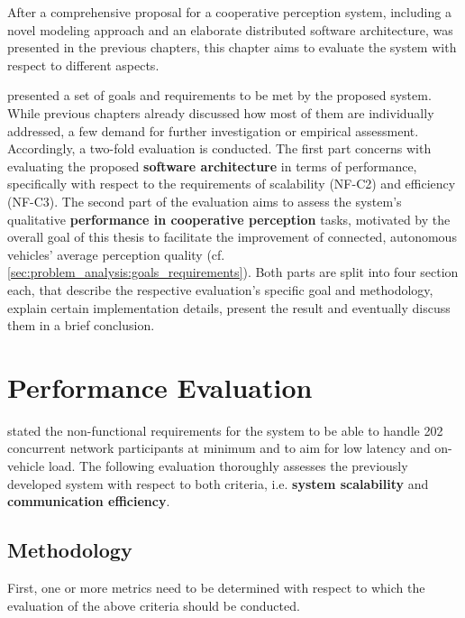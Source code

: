 After a comprehensive proposal for a cooperative perception system, including a novel modeling approach and an elaborate distributed software architecture, was presented in the previous chapters, this chapter aims to evaluate the system with respect to different aspects.

 presented a set of goals and requirements to be met by the proposed system. While previous chapters already discussed how most of them are individually addressed, a few demand for further investigation or empirical assessment. Accordingly, a two-fold evaluation is conducted. The first part concerns with evaluating the proposed \textbf{software architecture} in terms of performance, specifically with respect to the requirements of scalability (NF-C2) and efficiency (NF-C3). The second part of the evaluation aims to assess the system's qualitative \textbf{performance in cooperative perception} tasks, motivated by the overall goal of this thesis to facilitate the improvement of connected, autonomous vehicles' average perception quality (cf. \cref{sec:problem_analysis:goals_requirements}). Both parts are split into four section each, that describe the respective evaluation's specific goal and methodology, explain certain implementation details, present the result and eventually discuss them in a brief conclusion.

\section{Performance Evaluation}
\label{sec:evaluation:performance_evaluation}
 stated the non-functional requirements for the system to be able to handle 202 concurrent network participants at minimum and to aim for low latency and on-vehicle load. The following evaluation thoroughly assesses the previously developed system with respect to both criteria, i.e. \textbf{system scalability} and \textbf{communication efficiency}.

\subsection{Methodology}
\label{sec:evaluation:performance_evaluation:methodology}
First, one or more metrics need to be determined with respect to which the evaluation of the above criteria should be conducted.

